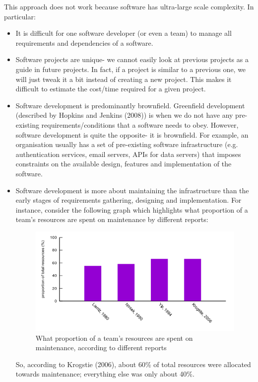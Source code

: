 \documentclass[a4paper, openany]{memoir}
\begin{document}
This approach does not work because software has ultra-large scale complexity. In particular:
\begin{itemize}
    \item It is difficult for one software developer (or even a team) to manage all requirements and dependencies of a software.
    
    \item Software projects are unique- we cannot easily look at previous projects as a guide in future projects. In fact, if a project is similar to a previous one, we will just tweak it a bit instead of creating a new project. This makes it difficult to estimate the cost/time required for a given project.
    
    \item Software development is predominantly brownfield. Greenfield development (described by Hopkins and Jenkins (2008)) is when we do not have any pre-existing requirements/conditions that a software needs to obey. However, software development is quite the opposite- it is brownfield. For example, an organisation usually has a set of pre-existing software infrastructure (e.g. authentication services, email servers, APIs for data servers) that imposes constraints on the available design, features and implementation of the software.
    
    \item Software development is more about maintaining the infrastructure than the early stages of requirements gathering, designing and implementation. For instance, consider the following graph which highlights what proportion of a team's resources are spent on maintenance by different reports:
    \begin{figure}[H]
        \centering
        \includegraphics[scale=0.55]{src/1.4 InfrastructureMaintenance.png}
        \caption{What proportion of a team's resources are spent on maintenance, according to different reports}
    \end{figure}
    So, according to Krogstie (2006), about 60\% of total resources were allocated towards maintenance; everything else was only about 40\%.
\end{itemize}
\end{document}

